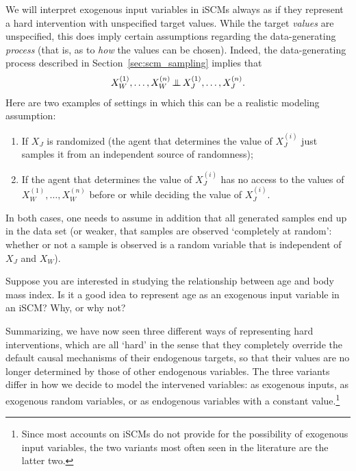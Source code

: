 \begin{Rem}
  We will interpret exogenous input variables in iSCMs always as if they represent a hard intervention with unspecified target values.
  While the target \emph{values} are unspecified, this does imply certain assumptions regarding the data-generating \emph{process} (that is, as to \emph{how} the values can be chosen).
  Indeed, the data-generating process described in Section~\ref{sec:scm_sampling} implies that
    $$X_W^{(1)},\dots,X_W^{(n)} \operatorname*{\perp\mkern-11mu\perp} X_J^{(1)},\dots,X_J^{(n)}.$$
  Here are two examples of settings in which this can be a realistic modeling assumption:
  \begin{enumerate}
    \item If $X_J$ is randomized (the agent that determines the value of $X_J^{(i)}$ just samples it from an independent source of randomness);
    \item If the agent that determines the value of $X_J^{(i)}$ has no access to the values of $X_W^{(1)},\dots,X_W^{(n)}$ before or while deciding the value of $X_J^{(i)}$.
  \end{enumerate}
  In both cases, one needs to assume in addition that all generated samples end up in the data set (or weaker, that samples are observed `completely at random': whether or
  not a sample is observed is a random variable that is independent of $X_J$ and $X_W$).
\end{Rem}

\begin{Exc}
  Suppose you are interested in studying the relationship between age and body mass index.
  Is it a good idea to represent age as an exogenous input variable in an iSCM?
  Why, or why not?
\end{Exc}

Summarizing, we have now seen three different ways of representing hard interventions, which are all `hard' in the sense that they completely override the default causal mechanisms of their endogenous targets, so that their values are no longer determined by those of other endogenous variables. 
The three variants differ in how we decide to model the intervened variables: as exogenous inputs, as exogenous random variables, or as endogenous variables with a constant value.\footnote{Since most accounts on iSCMs do not provide for the possibility of exogenous input variables, the two variants most often seen in the literature are the latter two.}



